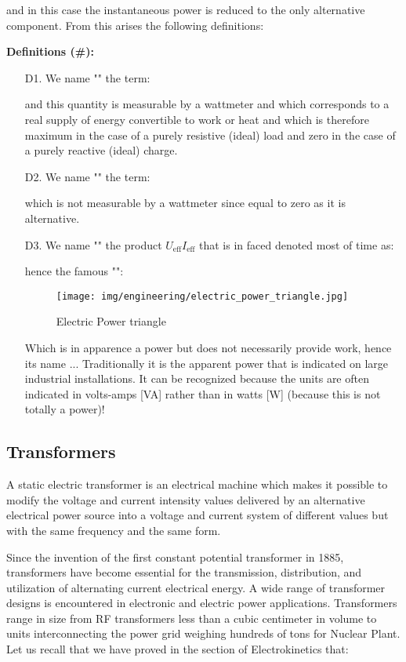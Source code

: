 	and in this case the instantaneous power is reduced to the only alternative component. From this arises the following definitions:
	
	\textbf{Definitions (\#\mydef):}
	\begin{enumerate}
		\item[D1.] We name "" the term:
		
		and this quantity is measurable by a wattmeter and which corresponds to a real supply of energy convertible to work or heat and which is therefore maximum in the case of a purely resistive (ideal) load and zero in the case of a purely reactive (ideal) charge.

		\item[D2.] We name "" the term:
		
		which is not measurable by a wattmeter since equal to zero as it is alternative.

		\item[D3.] We name "" the product $U_\text{eff}I_\text{eff}$ that is in faced denoted most of time as:
		
		hence the famous "":
		\begin{figure}[H]
		\centering
		\texttt{[image: img/engineering/electric\_power\_triangle.jpg]}
		\caption{Electric Power triangle}
	\end{figure}
		Which is in apparence a power but does not necessarily provide work, hence its name ... Traditionally it is the apparent power that is indicated on large industrial installations. It can be recognized because the units are often indicated in volts-amps [VA] rather than in watts [W] (because this is not totally a power)!
	\end{enumerate} 	
	
	\subsection{Transformers}
	A static electric transformer is an electrical machine which makes it possible to modify the voltage and current intensity values delivered by an alternative electrical power source into a voltage and current system of different values but with the same frequency and the same form.
	
	Since the invention of the first constant potential transformer in 1885, transformers have become essential for the transmission, distribution, and utilization of alternating current electrical energy. A wide range of transformer designs is encountered in electronic and electric power applications. Transformers range in size from RF transformers less than a cubic centimeter in volume to units interconnecting the power grid weighing hundreds of tons for Nuclear Plant.
	Let us recall that we have proved in the section of Electrokinetics that:
	

